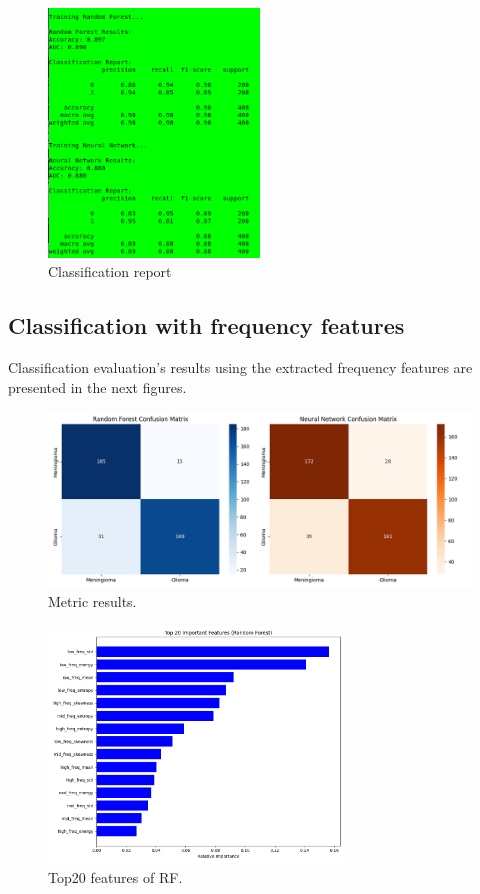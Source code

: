 \documentclass[11pt,a4paper]{article}
\begin{document}
		\begin{figure}[H]
			\centering
			\includegraphics[width=0.5\textwidth]{images/report_pyradiomics.png}
			\caption{Classification report}
			\label{fig1:}
		\end{figure}		

	\subsection{Classification with frequency features}
		

		Classification evaluation's results using the extracted frequency features are presented in the 
		next figures.

		\begin{figure}[h]
			\centering
			\includegraphics[width=1.1\textwidth]{images/freq_metrics.png}
			\caption{Metric results.}
			\label{fig1:}
		\end{figure}		

		\begin{figure}[h]
			\centering
			\includegraphics[width=0.7\textwidth]{images/freq_top_rf.png}
			\caption{Top20 features of RF.}
			\label{fig1:}
		\end{figure}		
\end{document}
